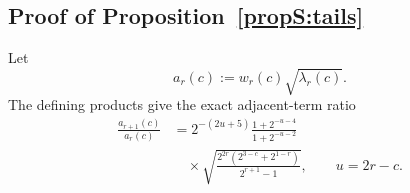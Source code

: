 \documentclass[journal,twocolumn]{IEEEtran}
\theoremstyle{definition}
\theoremstyle{plain}
\begin{document}
\subsection{Proof of Proposition~\ref{propS:tails}}
\label{app:proof-tails}

Let
\begin{equation}
 a_r(c):=w_r(c)\sqrt{\lambda_r(c)}.
 \label{eqS:a-limit}
\end{equation}
The defining products give the exact adjacent-term ratio
\begin{equation}
 \begin{aligned}
 \frac{a_{r+1}(c)}{a_r(c)}
 &=2^{-(2u+5)}\frac{1+2^{-u-4}}{1+2^{-u-2}}\\
 &\quad\times\sqrt{\frac{2^{2r}(2^{3-c}+2^{1-r})}{2^{r+1}-1}},
 \qquad u=2r-c.
 \end{aligned}
 \label{eqS:term-ratio}
\end{equation}
\end{document}
